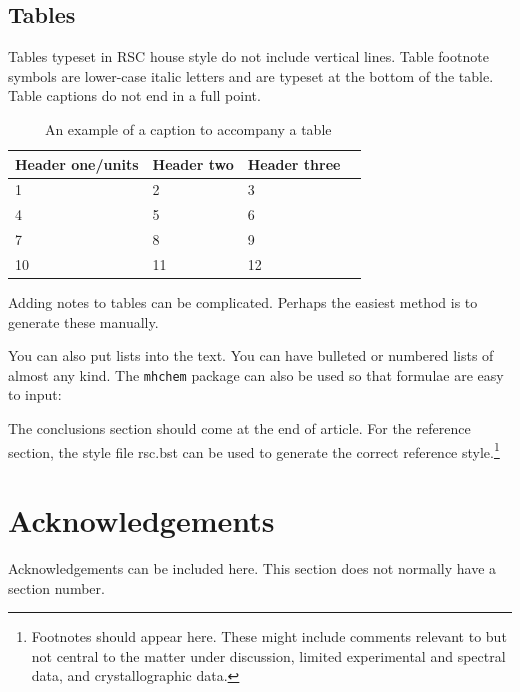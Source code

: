 \documentclass[8.5pt,twoside]{article}
\begin{document}
\subsection{Tables}
Tables typeset in RSC house style do not include vertical lines. Table footnote symbols are lower-case italic letters and are typeset at the bottom of the table. Table captions do not end in a full point.\cite{Arduengo1992,Eisenstein2005}


\begin{table}[h]
\small
\centering
  \caption{~An example of a caption to accompany a table}
  \label{tbl:example}
  \begin{tabular}{l l l l} %
    \hline
    Header one/units & Header two & Header three \\
    \hline
    1 & 2 & 3 \\
    4 & 5 & 6 \\
    7 & 8 & 9 \\
    10 & 11 & 12 \\
    \hline
  \end{tabular}
\end{table}


Adding notes to tables can be complicated.  Perhaps the easiest
method is to generate these manually.

You can also put lists into the text. You can have bulleted or numbered lists of almost any kind. 
The \texttt{mhchem} package can also be used so
that formulae are easy to input: 



The conclusions section should come at the end of article. For the reference section, the style file rsc.bst can be used to generate the correct reference style.\footnote[4]{Footnotes should appear here. These might include comments relevant to but not central to the matter under discussion, limited experimental and spectral data, and crystallographic data.}

\section*{Acknowledgements}
Acknowledgements can be included here. This section does not normally have a section number.





\footnotesize{

}
\end{document}
